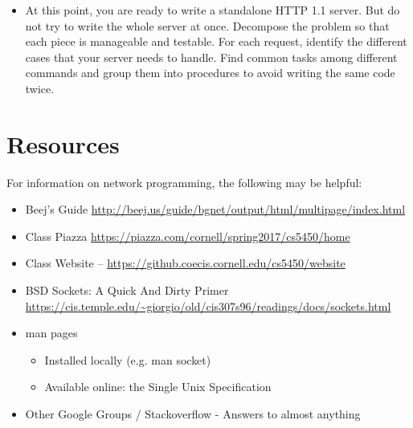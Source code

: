 \documentclass[12pt]{article}
\begin{document}
\begin{itemize}
\item At this point, you are ready to write a standalone HTTP 1.1 server. But do not try to write the whole server at once. Decompose the problem so that each piece is manageable and testable. For each request, identify the different cases that your server needs to handle. Find common tasks among different commands and group them into procedures to avoid writing the same code twice.
\end{itemize}

\section{Resources}

For information on network programming, the following may be helpful:
\begin{itemize}


 \item Beej’s Guide \url{http://beej.us/guide/bgnet/output/html/multipage/index.html}
 \item  Class Piazza \url{https://piazza.com/cornell/spring2017/cs5450/home}
\item  Class Website – \url{https://github.coecis.cornell.edu/cs5450/website}
\item  BSD Sockets: A Quick And Dirty Primer \url{https://cis.temple.edu/~giorgio/old/cis307s96/readings/docs/sockets.html}

\item  man pages
\begin{itemize}
\item  Installed locally (e.g. man socket)
\item Available online: the Single Unix Specification
\end{itemize}
\item  Other Google Groups / Stackoverflow - Answers to almost anything
\end{itemize}

% 
% 
\end{document}
